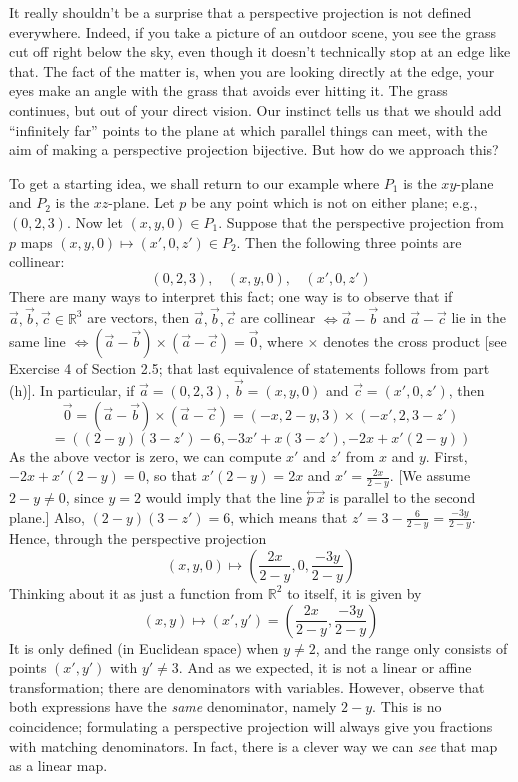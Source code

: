 \documentclass[leqno]{book}
\begin{document}
It really shouldn't be a surprise that a perspective projection is not defined everywhere.  Indeed, if you take a picture of an outdoor scene, you see the grass cut off right below the sky, even though it doesn't technically stop at an edge like that.  The fact of the matter is, when you are looking directly at the edge, your eyes make an angle with the grass that avoids ever hitting it.  The grass continues, but out of your direct vision.  Our instinct tells us that we should add ``infinitely far'' points to the plane at which parallel things can meet, with the aim of making a perspective projection bijective.  But how do we approach this?

To get a starting idea, we shall return to our example where $P_1$ is the $xy$-plane and $P_2$ is the $xz$-plane.  Let $p$ be any point which is not on either plane; e.g., $(0,2,3)$.  Now let $(x,y,0)\in P_1$.  Suppose that the perspective projection from $p$ maps $(x,y,0)\mapsto(x',0,z')\in P_2$.  Then the following three points are collinear:
$$(0,2,3),~~~~(x,y,0),~~~~(x',0,z')$$
There are many ways to interpret this fact; one way is to observe that if $\vec a,\vec b,\vec c\in\mathbb R^3$ are vectors, then $\vec a,\vec b,\vec c$ are collinear $\iff\vec a-\vec b$ and $\vec a-\vec c$ lie in the same line $\iff(\vec a-\vec b)\times(\vec a-\vec c)=\vec 0$, where $\times$ denotes the cross product [see Exercise 4 of Section 2.5; that last equivalence of statements follows from part (h)].  In particular, if $\vec a=(0,2,3)$, $\vec b=(x,y,0)$ and $\vec c=(x',0,z')$, then
$$\vec 0=(\vec a-\vec b)\times(\vec a-\vec c)=(-x,2-y,3)\times(-x',2,3-z')$$
$$=((2-y)(3-z')-6,-3x'+x(3-z'),-2x+x'(2-y))$$
As the above vector is zero, we can compute $x'$ and $z'$ from $x$ and $y$.  First, $-2x+x'(2-y)=0$, so that $x'(2-y)=2x$ and $x'=\frac{2x}{2-y}$.  [We assume $2-y\ne 0$, since $y=2$ would imply that the line $\overset{\longleftrightarrow}{p~x}$ is parallel to the second plane.]  Also, $(2-y)(3-z')=6$, which means that $z'=3-\frac 6{2-y}=\frac{-3y}{2-y}$.  Hence, through the perspective projection
$$(x,y,0)\mapsto\left(\frac{2x}{2-y},0,\frac{-3y}{2-y}\right)$$
Thinking about it as just a function from $\mathbb R^2$ to itself, it is given by
\begin{equation}\tag{*}(x,y)\mapsto(x',y')=\left(\frac{2x}{2-y},\frac{-3y}{2-y}\right)\end{equation}
It is only defined (in Euclidean space) when $y\ne 2$, and the range only consists of points $(x',y')$ with $y'\ne 3$.  And as we expected, it is not a linear or affine transformation; there are denominators with variables.  However, observe that both expressions have the \emph{same} denominator, namely $2-y$.  This is no coincidence; formulating a perspective projection will always give you fractions with matching denominators.  In fact, there is a clever way we can \emph{see} that map as a linear map.
\end{document}
